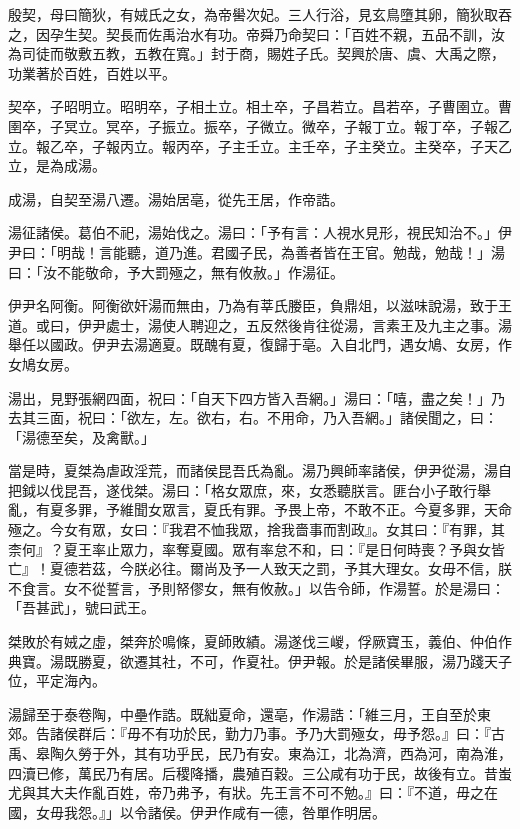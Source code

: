 
\begin{pinyinscope}
殷契，母曰簡狄，有娀氏之女，為帝嚳次妃。三人行浴，見玄鳥墮其卵，簡狄取吞之，因孕生契。契長而佐禹治水有功。帝舜乃命契曰：「百姓不親，五品不訓，汝為司徒而敬敷五教，五教在寬。」封于商，賜姓子氏。契興於唐、虞、大禹之際，功業著於百姓，百姓以平。

契卒，子昭明立。昭明卒，子相土立。相土卒，子昌若立。昌若卒，子曹圉立。曹圉卒，子冥立。冥卒，子振立。振卒，子微立。微卒，子報丁立。報丁卒，子報乙立。報乙卒，子報丙立。報丙卒，子主壬立。主壬卒，子主癸立。主癸卒，子天乙立，是為成湯。

成湯，自契至湯八遷。湯始居亳，從先王居，作帝誥。

湯征諸侯。葛伯不祀，湯始伐之。湯曰：「予有言：人視水見形，視民知治不。」伊尹曰：「明哉！言能聽，道乃進。君國子民，為善者皆在王官。勉哉，勉哉！」湯曰：「汝不能敬命，予大罰殛之，無有攸赦。」作湯征。

伊尹名阿衡。阿衡欲奸湯而無由，乃為有莘氏媵臣，負鼎俎，以滋味說湯，致于王道。或曰，伊尹處士，湯使人聘迎之，五反然後肯往從湯，言素王及九主之事。湯舉任以國政。伊尹去湯適夏。既醜有夏，復歸于亳。入自北門，遇女鳩、女房，作女鳩女房。

湯出，見野張網四面，祝曰：「自天下四方皆入吾網。」湯曰：「嘻，盡之矣！」乃去其三面，祝曰：「欲左，左。欲右，右。不用命，乃入吾網。」諸侯聞之，曰：「湯德至矣，及禽獸。」

當是時，夏桀為虐政淫荒，而諸侯昆吾氏為亂。湯乃興師率諸侯，伊尹從湯，湯自把鉞以伐昆吾，遂伐桀。湯曰：「格女眾庶，來，女悉聽朕言。匪台小子敢行舉亂，有夏多罪，予維聞女眾言，夏氏有罪。予畏上帝，不敢不正。今夏多罪，天命殛之。今女有眾，女曰：『我君不恤我眾，捨我嗇事而割政』。女其曰：『有罪，其柰何』？夏王率止眾力，率奪夏國。眾有率怠不和，曰：『是日何時喪？予與女皆亡』！夏德若茲，今朕必往。爾尚及予一人致天之罰，予其大理女。女毋不信，朕不食言。女不從誓言，予則帑僇女，無有攸赦。」以告令師，作湯誓。於是湯曰：「吾甚武」，號曰武王。

桀敗於有娀之虛，桀奔於鳴條，夏師敗績。湯遂伐三嵕，俘厥寶玉，義伯、仲伯作典寶。湯既勝夏，欲遷其社，不可，作夏社。伊尹報。於是諸侯畢服，湯乃踐天子位，平定海內。

湯歸至于泰卷陶，中壘作誥。既絀夏命，還亳，作湯誥：「維三月，王自至於東郊。告諸侯群后：『毋不有功於民，勤力乃事。予乃大罰殛女，毋予怨。』曰：『古禹、皋陶久勞于外，其有功乎民，民乃有安。東為江，北為濟，西為河，南為淮，四瀆已修，萬民乃有居。后稷降播，農殖百穀。三公咸有功于民，故後有立。昔蚩尤與其大夫作亂百姓，帝乃弗予，有狀。先王言不可不勉。』曰：『不道，毋之在國，女毋我怨。』」以令諸侯。伊尹作咸有一德，咎單作明居。


\end{pinyinscope}
